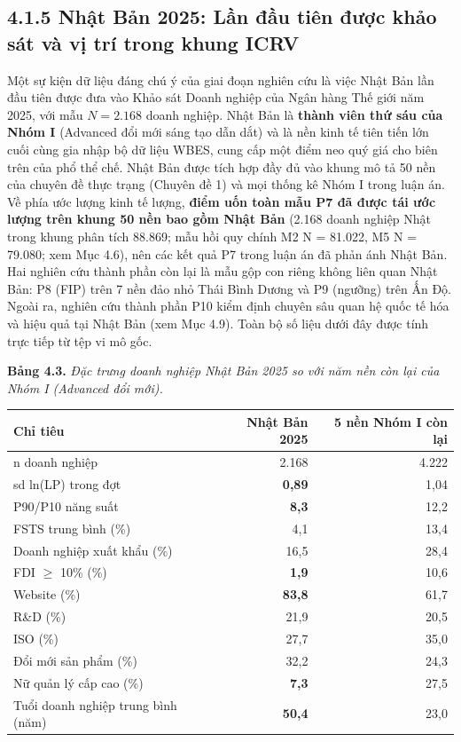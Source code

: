 \documentclass[
  a4paper,
  13pt]{extreport}
\begin{document}
\hypertarget{nhux1eadt-bux1ea3n-2025-lux1ea7n-ux111ux1ea7u-tiuxean-ux111ux1b0ux1ee3c-khux1ea3o-suxe1t-vuxe0-vux1ecb-truxed-trong-khung-icrv}{%
\subsection{4.1.5 Nhật Bản 2025: Lần đầu tiên được khảo sát và vị trí
trong khung
ICRV}\label{nhux1eadt-bux1ea3n-2025-lux1ea7n-ux111ux1ea7u-tiuxean-ux111ux1b0ux1ee3c-khux1ea3o-suxe1t-vuxe0-vux1ecb-truxed-trong-khung-icrv}}

Một sự kiện dữ liệu đáng chú ý của giai đoạn nghiên cứu là việc Nhật Bản
lần đầu tiên được đưa vào Khảo sát Doanh nghiệp của Ngân hàng Thế giới
năm 2025, với mẫu \(N = 2.168\) doanh nghiệp. Nhật Bản là \textbf{thành
viên thứ sáu của Nhóm I} (Advanced đổi mới sáng tạo dẫn dắt) và là nền
kinh tế tiên tiến lớn cuối cùng gia nhập bộ dữ liệu WBES, cung cấp một
điểm neo quý giá cho biên trên của phổ thể chế. Nhật Bản được tích hợp
đầy đủ vào khung mô tả 50 nền của chuyên đề thực trạng (Chuyên đề 1) và
mọi thống kê Nhóm I trong luận án. Về phía ước lượng kinh tế lượng,
\textbf{điểm uốn toàn mẫu P7 đã được tái ước lượng trên khung 50 nền bao
gồm Nhật Bản} (2.168 doanh nghiệp Nhật trong khung phân tích 88.869; mẫu
hồi quy chính M2 N = 81.022, M5 N = 79.080; xem Mục 4.6), nên các kết
quả P7 trong luận án đã phản ánh Nhật Bản. Hai nghiên cứu thành phần còn
lại là mẫu gộp con riêng không liên quan Nhật Bản: P8 (FIP) trên 7 nền
đảo nhỏ Thái Bình Dương và P9 (ngưỡng) trên Ấn Độ. Ngoài ra, nghiên cứu
thành phần P10 kiểm định chuyên sâu quan hệ quốc tế hóa và hiệu quả tại
Nhật Bản (xem Mục 4.9). Toàn bộ số liệu dưới đây được tính trực tiếp từ
tệp vi mô gốc.

\textbf{Bảng 4.3.} \emph{Đặc trưng doanh nghiệp Nhật Bản 2025 so với năm
nền còn lại của Nhóm I (Advanced đổi mới).}

\begin{longtable}[]{@{}lrr@{}}
\toprule\noalign{}
Chỉ tiêu & Nhật Bản 2025 & 5 nền Nhóm I còn lại \\
\midrule\noalign{}
\endhead
\bottomrule\noalign{}
\endlastfoot
n doanh nghiệp & 2.168 & 4.222 \\
sd ln(LP) trong đợt & \textbf{0,89} & 1,04 \\
P90/P10 năng suất & \textbf{8,3} & 12,2 \\
FSTS trung bình (\%) & 4,1 & 13,4 \\
Doanh nghiệp xuất khẩu (\%) & 16,5 & 28,4 \\
FDI \(\geq\) 10\% (\%) & \textbf{1,9} & 10,6 \\
Website (\%) & \textbf{83,8} & 61,7 \\
R\&D (\%) & 21,9 & 20,5 \\
ISO (\%) & 27,7 & 35,0 \\
Đổi mới sản phẩm (\%) & 32,2 & 24,3 \\
Nữ quản lý cấp cao (\%) & \textbf{7,3} & 27,5 \\
Tuổi doanh nghiệp trung bình (năm) & \textbf{50,4} & 23,0 \\
\end{longtable}
\end{document}

